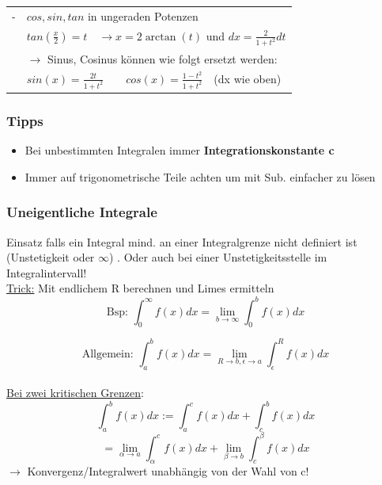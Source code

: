 \documentclass[6pt]{article}
\begin{document}
\begin{multicols*}{3}
\begin{onehalfspace}
\begin{tabular}{ll}
				- 	& $cos, sin, tan$ in ungeraden Potenzen  \\
					&	$tan(\frac{x}{2}) = t  \quad \rightarrow x=2\arctan(t)$ und $dx = \frac{2}{1+t^2}dt$\\
					& $\rightarrow $ Sinus, Cosinus k{\"o}nnen wie folgt ersetzt werden: \vspace{1mm} \\
					& $sin(x)=\frac{2t}{1+t^2} \qquad cos(x) =\frac{1-t^2}{1+t^2} \quad$(dx wie oben) 	 \vspace{2mm} \\ \hline
				
				
			\end{tabular}
		\end{onehalfspace}


	\subsubsection*{Tipps}
	\begin{itemize}[itemsep=2pt, parsep=3pt ]
		\item Bei unbestimmten Integralen immer {\bf Integrationskonstante c }	
		\item Immer auf trigonometrische Teile achten um mit Sub. einfacher zu l{\"o}sen
	\end{itemize}
		
		

	\vfill\eject
	\subsubsection*{Uneigentliche Integrale}	
	Einsatz falls ein Integral mind. an einer Integralgrenze nicht definiert ist (Unstetigkeit oder $\infty$) . Oder auch bei einer Unstetigkeitsstelle im Integralintervall!
	\vspace{2mm} \\
	
	\underline{Trick:} Mit endlichem R berechnen und Limes ermitteln
	\vspace{4mm}\\
	\[ 
		\text{Bsp: } \int_{0}^{\infty} f(x)  dx = \lim\limits_{b \to \infty}  \int_{0}^{b}f(x) dx
	\]
	
	\[ 
		\text{Allgemein: } \int_{a}^{b} f(x)  dx = \lim\limits_{R \to b, \epsilon \to a } \int_{\epsilon}^{R}f(x) dx
	\]
	\vspace{3mm}\\
	
	\underline{Bei zwei kritischen Grenzen}:
	 \[ 
		\int_{a}^{b} f(x)  dx := \int_{a}^{c} f(x)  dx + \int_{c}^{b} f(x)  dx
	\]
	 \[ 
		=  \lim\limits_{\alpha \to a}  \int_{\alpha}^{c}f(x) dx + \lim\limits_{\beta \to b}  \int_{c}^{\beta}f(x) dx
	\]
	$\rightarrow$ Konvergenz/Integralwert unabh{\"a}ngig von der Wahl von c!
	

\end{multicols*}
\end{document}
